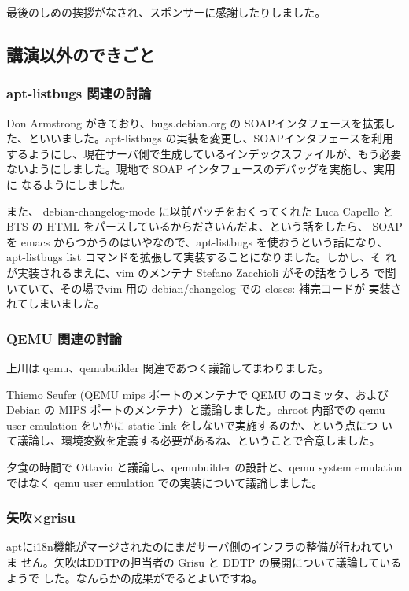 \documentclass[mingoth,a4paper]{jsarticle}
\begin{document}
最後のしめの挨拶がなされ、スポンサーに感謝したりしました。

\subsection{講演以外のできごと}

\subsubsection{apt-listbugs 関連の討論}

Don Armstrong がきており、bugs.debian.org の SOAPインタフェースを拡張し
た、といいました。apt-listbugs の実装を変更し、SOAPインタフェースを利用
するようにし、現在サーバ側で生成しているインデックスファイルが、もう必要
ないようにしました。現地で SOAP インタフェースのデバッグを実施し、実用に
なるようにしました。

また、 debian-changelog-mode に以前パッチをおくってくれた Luca Capello 
と BTS の HTML をパースしているからださいんだよ、という話をしたら、 SOAP 
を emacs からつかうのはいやなので、apt-listbugs を使おうという話になり、 
apt-listbugs list コマンドを拡張して実装することになりました。しかし、そ
れが実装されるまえに、vim のメンテナ Stefano Zacchioli がその話をうしろ
で聞いていて、その場でvim 用の debian/changelog での closes: 補完コードが
実装されてしまいました。

\subsubsection{QEMU 関連の討論}

上川は qemu、qemubuilder 関連であつく議論してまわりました。

Thiemo Seufer (QEMU mips ポートのメンテナで QEMU のコミッタ、および
Debian の MIPS ポートのメンテナ）と議論しました。chroot 内部での qemu
user emulation をいかに static link をしないで実施するのか、という点につ
いて議論し、環境変数を定義する必要があるね、ということで合意しました。

夕食の時間で Ottavio と議論し、qemubuilder の設計と、qemu system
emulation ではなく qemu user emulation での実装について議論しました。


\subsubsection{矢吹×grisu}

aptにi18n機能がマージされたのにまだサーバ側のインフラの整備が行われていま
せん。矢吹はDDTPの担当者の Grisu と DDTP の展開について議論しているようで
した。なんらかの成果がでるとよいですね。
\end{document}
